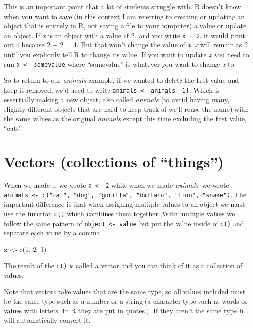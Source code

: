 \documentclass[
  12pt,
  openany]{book}
\newenvironment{Shaded}{\begin{snugshade}}{\end{snugshade}}
\newcommand{\DecValTok}[1]{\textcolor[rgb]{0.06,0.06,0.06}{#1}}
\newcommand{\FunctionTok}[1]{\textcolor[rgb]{0,0,0}{#1}}
\newcommand{\NormalTok}[1]{#1}
\newcommand{\OtherTok}[1]{\textcolor[rgb]{0.37,0.37,0.37}{#1}}
\begin{document}
This is an important point that a lot of students struggle with. R doesn't know when you want to save (in this context I am referring to creating or updating an object that is entirely in R, not saving a file to your computer) a value or update an object. If \emph{x} is an object with a value of 2, and you write \texttt{x\ +\ 2}, it would print out 4 because 2 + 2 = 4. But that won't change the value of \emph{x}. \emph{x} will remain as 2 until you explicitly tell R to change its value. If you want to update \emph{x} you need to run \texttt{x\ \textless{}-\ somevalue} where ``somevalue'' is whatever you want to change \emph{x} to.

So to return to our \emph{animals} example, if we wanted to delete the first value and keep it removed, we'd need to write \texttt{animals\ \textless{}-\ animals{[}-1{]}}. Which is essentially making a new object, also called \emph{animals} (to avoid having many, slightly different objects that are hard to keep track of we'll reuse the name) with the same values as the original \emph{animals} except this time excluding the first value, ``cats''.

\hypertarget{vectors}{%
\section{Vectors (collections of ``things'')}\label{vectors}}

When we made \emph{x}, we wrote \texttt{x\ \textless{}-\ 2} while when we made \emph{animals}, we wrote \texttt{animals\ \textless{}-\ c("cat",\ "dog",\ "gorilla",\ "buffalo",\ "lion",\ "snake")}. The important difference is that when assigning multiple values to an object we must use the function \texttt{c()} which \textbf{c}ombines them together. With multiple values we follow the same pattern of \texttt{object\ \textless{}-\ value} but put the value inside of \texttt{c()} and separate each value by a comma.

\begin{Shaded}
\begin{Highlighting}[]
\NormalTok{x }\OtherTok{\textless{}{-}} \FunctionTok{c}\NormalTok{(}\DecValTok{1}\NormalTok{, }\DecValTok{2}\NormalTok{, }\DecValTok{3}\NormalTok{)}
\end{Highlighting}
\end{Shaded}

The result of the \texttt{c()} is called a vector and you can think of it as a collection of values.

Note that vectors take values that are the same type, so all values included must be the same type such as a number or a string (a character type such as words or values with letters. In R they are put in quotes.). If they aren't the same type R will automatically convert it.
\end{document}
